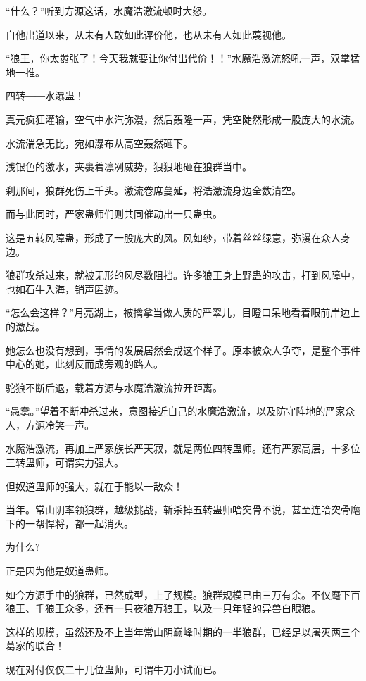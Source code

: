 
\begin{this_body}

“什么？”听到方源这话，水魔浩激流顿时大怒。

自他出道以来，从未有人敢如此评价他，也从未有人如此蔑视他。

“狼王，你太嚣张了！今天我就要让你付出代价！！”水魔浩激流怒吼一声，双掌猛地一推。

四转――水瀑蛊！

真元疯狂灌输，空气中水汽弥漫，然后轰隆一声，凭空陡然形成一股庞大的水流。

水流湍急无比，宛如瀑布从高空轰然砸下。

浅银色的激水，夹裹着凛冽威势，狠狠地砸在狼群当中。

刹那间，狼群死伤上千头。激流卷席蔓延，将浩激流身边全数清空。

而与此同时，严家蛊师们则共同催动出一只蛊虫。

这是五转风障蛊，形成了一股庞大的风。风如纱，带着丝丝绿意，弥漫在众人身边。

狼群攻杀过来，就被无形的风尽数阻挡。许多狼王身上野蛊的攻击，打到风障中，也如石牛入海，销声匿迹。

“怎么会这样？”月亮湖上，被擒拿当做人质的严翠儿，目瞪口呆地看着眼前岸边上的激战。

她怎么也没有想到，事情的发展居然会成这个样子。原本被众人争夺，是整个事件中心的她，此刻反而成旁观的路人。

驼狼不断后退，载着方源与水魔浩激流拉开距离。

“愚蠢。”望着不断冲杀过来，意图接近自己的水魔浩激流，以及防守阵地的严家众人，方源冷笑一声。

水魔浩激流，再加上严家族长严天寂，就是两位四转蛊师。还有严家高层，十多位三转蛊师，可谓实力强大。

但奴道蛊师的强大，就在于能以一敌众！

当年。常山阴率领狼群，越级挑战，斩杀掉五转蛊师哈突骨不说，甚至连哈突骨麾下的一帮悍将，都一起消灭。

为什么?

正是因为他是奴道蛊师。

如今方源手中的狼群，已然成型，上了规模。狼群规模已由三万有余。不仅麾下百狼王、千狼王众多，还有一只夜狼万狼王，以及一只年轻的异兽白眼狼。

这样的规模，虽然还及不上当年常山阴巅峰时期的一半狼群，已经足以屠灭两三个葛家的联合！

现在对付仅仅二十几位蛊师，可谓牛刀小试而已。


\end{this_body}
